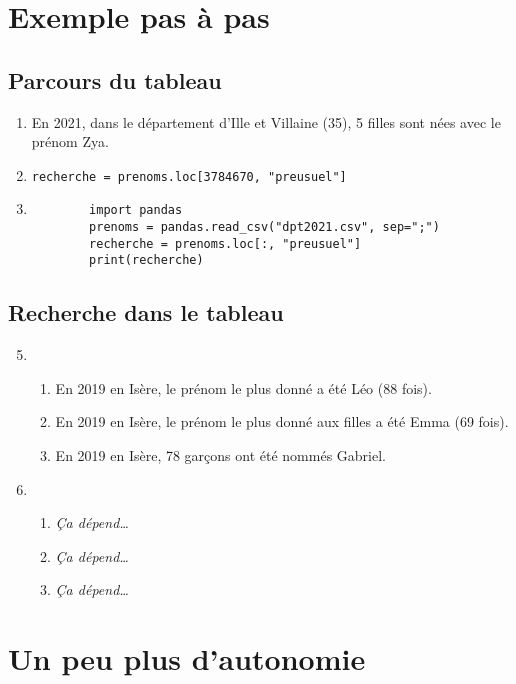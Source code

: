\documentclass[12pt]{article}
\begin{document}
\setcounter{section}{2}
\section{Exemple pas à pas}

\setcounter{subsection}{2}
\subsection{Parcours du tableau}

\begin{enumerate}
	\item  En 2021, dans le département d'Ille et Villaine (35), 5 filles sont nées avec le prénom Zya.
	\item \lstinline{recherche = prenoms.loc[3784670, "preusuel"]}
	\item
		\begin{lstlisting}
		import pandas
		prenoms = pandas.read_csv("dpt2021.csv", sep=";")
		recherche = prenoms.loc[:, "preusuel"]
		print(recherche)
		\end{lstlisting}
\end{enumerate}
\subsection{Recherche dans le tableau}
\begin{enumerate}
		\setcounter{enumi}{4}
	\item
		\begin{enumerate}
			\item En 2019 en Isère, le prénom le plus donné a été Léo (88 fois).
			\item En 2019 en Isère, le prénom le plus donné aux filles a été Emma (69 fois).
			\item En 2019 en Isère, 78 garçons ont été nommés Gabriel.
		\end{enumerate}
	\item
		\begin{enumerate}
			\item \emph{Ça dépend…}
			\item \emph{Ça dépend…}
			\item \emph{Ça dépend…}
		\end{enumerate}
\end{enumerate}

\section{Un peu plus d'autonomie}
\end{document}
